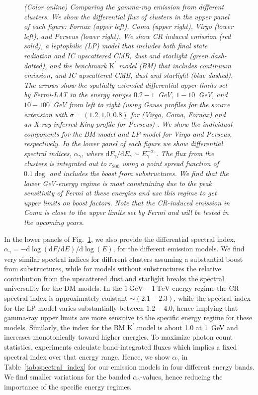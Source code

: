 \documentclass[10pt,aps,pra,reprint,amsmath,amsfonts,amssymb,showpacs,nofootinbib,floatfix]{revtex4-1}
\newcommand{\Fermi}{{\em Fermi}\xspace}
\newcommand{\rmn}{\mathrm}
\newcommand{\Kp}{\rmn{K}^\prime}
\newcommand{\gev}{\rmn{GeV}}
\newcommand{\tev}{\rmn{TeV}}
\newcommand{\dd}{\rmn{d}}
\newcommand{\rvir}{r_{200}}
\begin{document}
\begin{figure}
\begin{minipage}{2.0\columnwidth}
\caption{\it (Color online) Comparing the gamma-ray emission from
  different clusters. We show the differential flux of clusters in the
  upper panel of each figure: Fornax (upper left), Coma (upper right),
  Virgo (lower left), and Perseus (lower right). We show CR induced
  emission (red solid), a leptophilic (LP) model that includes both
  final state radiation and IC upscattered CMB, dust and starlight
  (green dash-dotted), and the benchmark $\Kp$ model (BM) that
  includes continuum emission, and IC upscattered CMB, dust and
  starlight (blue dashed). The arrows show the spatially extended
  differential upper limits set by \Fermi-LAT in the energy ranges
  $0.2-1$~GeV, $1-10$~GeV, and $10-100$~GeV from left to right (using
  Gauss profiles for the source extension with $\sigma=(1.2,1.0,0.8)$
  for (Virgo, Coma, Fornax) and an X-ray-inferred King profile for
  Perseus) \cite{2010ApJ...717L..71A}. We show the individual
  components for the BM model and LP model for Virgo and Perseus,
  respectively. In the lower panel of each figure we show differential
  spectral indices, $\alpha_\gamma$, where $\dd F_\gamma/\dd E_\gamma
  \sim E_\gamma^{-\alpha_\gamma}$. The flux from the clusters is
  integrated out to $\rvir$ using a point spread function of $0.1\deg$
  and includes the boost from substructures. We find that the lower
  GeV-energy regime is most constraining due to the peak sensitivity
  of \Fermi at these energies and use this regime to get upper limits
  on boost factors. Note that the CR-induced emission in Coma is close
  to the upper limits set by \Fermi and will be tested in the upcoming
  years.}
 \label{fig:clu_comp}
\end{minipage}
\end{figure}

In the lower panels of Fig.~\ref{fig:clu_comp}, we also provide the
differential spectral index, $\alpha_\gamma=-\dd \log(\dd F/\dd E)/\dd
\log(E)$, for the different emission models. We find very similar
spectral indices for different clusters assuming a substantial boost
from substructures, while for models without substructures the
relative contribution from the upscattered dust and starlight breaks
the spectral universality for the DM models. In the $1~\gev-1~\tev$
energy regime the CR spectral index is approximately constant $\sim
(2.1-2.3)$, while the spectral index for the LP model varies
substantially between $1.2-4.0$, hence implying that gamma-ray upper
limits are more sensitive to the specific energy regime for these
models. Similarly, the index for the BM $\Kp$ model is about 1.0 at
1~GeV and increases monotonically toward higher energies. To maximize
photon count statistics, experiments calculate band-integrated fluxes
which implies a fixed spectral index over that energy range. Hence, we
show $\alpha_\gamma$ in Table~\ref{tab:spectral_index} for our
emission models in four different energy bands. We find smaller
variations for the banded $\alpha_\gamma$-values, hence reducing the
importance of the specific energy regimes.
\end{document}
